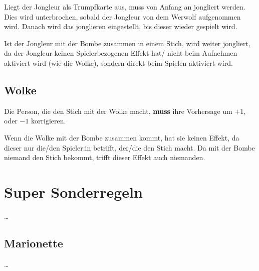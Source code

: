 \documentclass[3pt]{article}
\begin{document}
Liegt der Jongleur als Trumpfkarte aus, muss von Anfang an jongliert werden.
Dies wird unterbrochen, sobald der Jongleur von dem Werwolf aufgenommen wird.
Danach wird das jonglieren eingestellt, bis dieser wieder gespielt wird.

Ist der Jongleur mit der Bombe zusammen in einem Stich, wird weiter jongliert, da der Jongleur keinen Spielerbezogenen Effekt hat/ nicht beim Aufnehmen aktiviert wird (wie die Wolke), sondern direkt beim Spielen aktiviert wird.

\subsection{Wolke}
Die Person, die den Stich mit der Wolke macht, \textbf{muss} ihre Vorhersage um $+1$, oder $-1$ korrigieren.

Wenn die Wolke mit der Bombe zusammen kommt, hat sie keinen Effekt, da dieser nur die/den Spieler:in betrifft, der/die den Stich macht.
Da mit der Bombe niemand den Stich bekommt, trifft dieser Effekt auch niemanden.


\section{Super Sonderregeln}
\ldots

\subsection{Marionette}
\ldots
\end{document}
